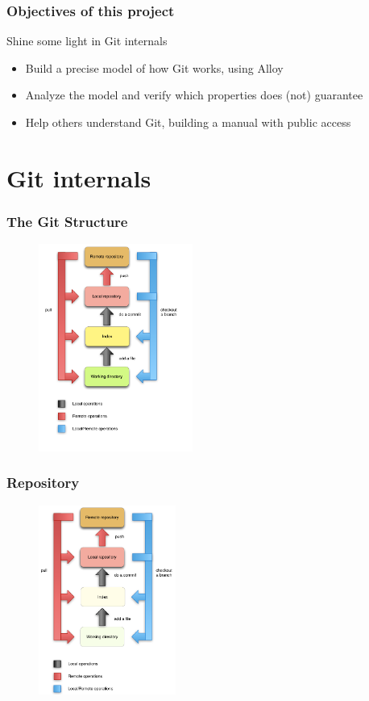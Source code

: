 \documentclass{beamer}
\begin{document}
\begin{frame}
	\frametitle{Objectives of this project}
	\begin{block}{Shine some light in Git internals}
		\begin{itemize}
			\item Build a precise model of how Git works, using 
			Alloy
			\item Analyze the model and verify which properties
			does (not) guarantee
			\item Help others understand Git, building
			a manual with public access
		\end{itemize}
	\end{block}
\end{frame}


\section{Git internals}

\begin{frame}
   \frametitle{The Git Structure}
   \begin{figure}
      \centering
      \includegraphics[width=0.45\textwidth]{images/git_workflow.png}
   \end{figure}
\end{frame}

\begin{frame}
   \frametitle{Repository}
   \begin{figure}
      \centering
      \includegraphics[width=0.4\textwidth]{images/workflow2.png}
   \end{figure}
\end{frame}
\end{document}
